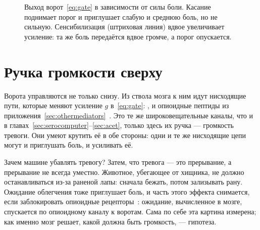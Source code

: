 \begin{figure}[t]
\centering
{}
\caption{Выход ворот~\eqref{eq:gate} в зависимости от силы боли. Касание поднимает порог и приглушает слабую и среднюю боль, но не сильную. Сенсибилизация (штриховая линия) вдвое увеличивает усиление: та же боль передаётся вдвое громче, а порог опускается.}
\label{fig:gatecurves}
\end{figure}

\section{Ручка громкости сверху}

Ворота управляются не только снизу. Из ствола мозга к ним идут нисходящие пути, которые меняют усиление $g$ в~\eqref{eq:gate}: ,  и опиоидные пептиды из приложения~\ref{sec:othermediators}~\cite{Fields2004}. Это те же широковещательные каналы, что и в главах~\ref{sec:serocomputer}--\ref{sec:acet}, только здесь их ручка --- громкость тревоги. Они умеют крутить её в обе стороны: одни и те же нисходящие цепи могут и приглушать боль, и усиливать её.

Зачем машине убавлять тревогу? Затем, что тревога --- это прерывание, а прерывание не всегда уместно. Животное, убегающее от хищника, не должно останавливаться из-за раненой лапы: сначала бежать, потом зализывать рану. Ожидание облегчения тоже приглушает боль, и часть этого эффекта снимается, если заблокировать опиоидные рецепторы~\cite{Levine1978}: ожидание, вычисленное в мозге, спускается по опиоидному каналу к воротам. Сама по себе эта картина измерена; как именно мозг решает, какой должна быть громкость, --- гипотеза.

